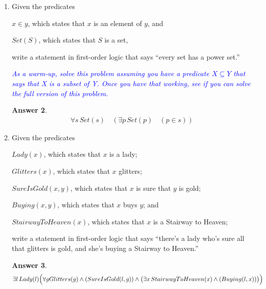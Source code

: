 \documentclass[a4paper]{article}
\renewcommand{\(}{\left(}
\renewcommand{\)}{\right)}
\theoremstyle{plain}
\theoremstyle{plain}
\theoremstyle{definition}
\newtheorem*{answer}{Answer}
\begin{document}
\begin{enumerate}[label*=\roman*.,ref=\roman*]
\qquad $x \in y$, which states that $x$ is an element of $y$, and

\qquad $\textit{Set}(S)$, which states that $S$ is a set,

write a statement in first-order logic that expresses the axiom of pairing.
\begin{shaded}
\begin{answer}
\begin{align*}
 \forall x , y \quad  \Bigl(\exists s \, Set(s) : (x \in s) \wedge (y \in s) \wedge \forall z \, (z \in s \quad \Rightarrow \quad  (z=x \vee z=y))\Bigr)
\end{align*}
\end{answer}
\end{shaded}
\item Given the predicates

\qquad $x \in y$, which states that $x$ is an element of $y$, and

\qquad $\textit{Set}(S)$, which states that $S$ is a set,

write a statement in first-order logic that says
``every set has a power set.''

\textit{\textcolor{blue}{ As a warm-up, solve this problem assuming you have a predicate
$X \subseteq Y$ that says that X is a subset of Y.
Once you have that working, see if you can solve the full version of this problem. }}
\begin{shaded}
\begin{answer}
\begin{align*}
  \forall s \, Set(s) \quad ( \exists p \, Set(p)  \quad (p \in s))
\end{align*}
\end{answer}
\end{shaded}
\item Given the predicates

\qquad $\textit{Lady}(x)$, which states that $x$ is a lady;

\qquad $\textit{Glitters}(x)$, which states that $x$ glitters;

\qquad $\textit{SureIsGold}(x, y)$,
which states that $x$ is sure that $y$ is gold;

\qquad $\textit{Buying}(x, y)$, which states that $x$ buys $y$; and

\qquad $\textit{StairwayToHeaven}(x)$,
which states that $x$ is a Stairway to Heaven;

write a statement in first-order logic that says
``there's a lady who's sure all that glitters is gold,
and she's buying a Stairway to Heaven.''
\begin{shaded}
\begin{answer}
\begin{align*}
  \exists l \, Lady(l) \Bigl(\forall g Glitters(g)\wedge (SureIsGold(l,g)) \wedge \bigl(\exists x \, StairwayToHeaven(x)\wedge (Buying(l,x))\bigr)\Bigr)
\end{align*}
\end{answer}
\end{shaded}
\end{enumerate}
\end{document}
